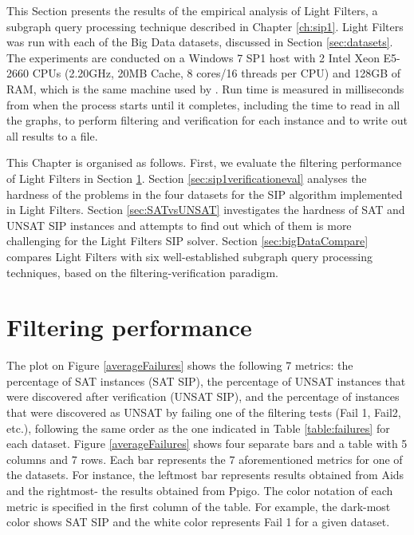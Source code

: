 \documentclass{l4proj}
\newcounter{example}[section]
\begin{document}
This Section presents the results of the empirical analysis of Light Filters, a subgraph query processing technique described in Chapter \ref{ch:sip1}. Light Filters was run with each of the Big Data datasets, discussed in Section \ref{sec:datasets}. The experiments are conducted on a Windows 7 SP1 host with 2 Intel Xeon E5-2660 CPUs (2.20GHz, 20MB Cache, 8 cores/16 threads per CPU) and 128GB of RAM, which is the same machine used by \cite{foteini}. Run time is measured in milliseconds from when the process starts until it completes, including the time to read in all the graphs, to perform filtering and verification for each instance and to write out all results to a file.

This Chapter is organised as follows. First, we evaluate the filtering performance of Light Filters in Section \ref{sec:sip1filterseval}. Section \ref{sec:sip1verificationeval} analyses the hardness of the problems in the four datasets for the SIP algorithm implemented in Light Filters. Section \ref{sec:SATvsUNSAT} investigates the hardness of SAT and UNSAT SIP instances and attempts to find out which of them is more challenging for the Light Filters SIP solver. Section \ref{sec:bigDataCompare} compares Light Filters with six well-established subgraph query processing techniques, based on the filtering-verification paradigm.

\section{Filtering performance}
\label{sec:sip1filterseval}
The plot on Figure \ref{averageFailures} shows the following 7 metrics: the percentage of SAT instances (SAT SIP), the percentage of UNSAT instances that were discovered after verification (UNSAT SIP), and the percentage of instances that were discovered as UNSAT by failing one of the filtering tests (Fail 1, Fail2, etc.), following the same order as the one indicated in Table \ref{table:failures} for each dataset. Figure \ref{averageFailures} shows four separate bars and a table with 5 columns and 7 rows. Each bar represents the 7 aforementioned metrics for one of the datasets. For instance, the leftmost bar represents results obtained from Aids and the rightmost- the results obtained from Ppigo. The color notation of each metric is specified in the first column of the table. For example, the dark-most color shows SAT SIP and the white color represents Fail 1 for a given dataset.
\end{document}
